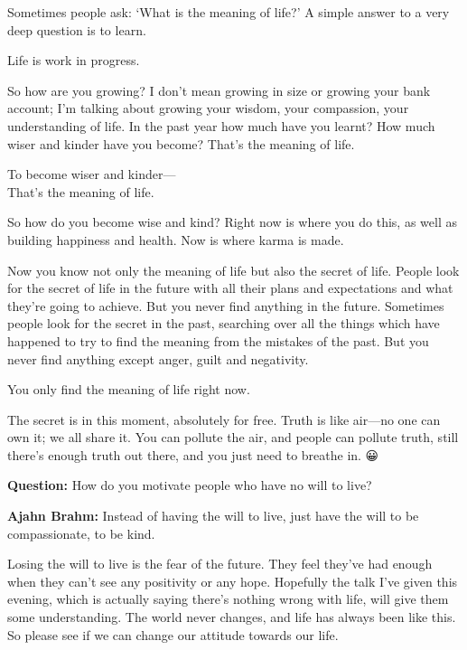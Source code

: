 \documentclass[12pt, openany]{book}
\newenvironment{aphorism}%
{%
\begin{center}\begin{itshape}
}%
{\end{itshape}\end{center}
}%
\begin{document}
Sometimes people ask: ‘What is the meaning of life?’ A simple answer to a very deep question is to learn. 

\begin{aphorism}
Life is work in progress.
\end{aphorism}

So how are you growing? I don’t mean growing in size or growing your bank account; I’m talking about growing your wisdom, your compassion, your understanding of life. In the past year how much have you learnt? How much wiser and kinder have you become? That’s the meaning of life. 

\begin{aphorism}
To become wiser and kinder—\\  
That’s the meaning of life.
\end{aphorism}

So how do you become wise and kind? Right now is where you do this, as well as building happiness and health. Now is where karma is made. 

Now you know not only the meaning of life but also the secret of life. People look for the secret of life in the future with all their plans and expectations and what they’re going to achieve. But you never find anything in the future. Sometimes people look for the secret in the past, searching over all the things which have happened to try to find the meaning from the mistakes of the past. But you never find anything except anger, guilt and negativity. 

\begin{aphorism}
You only find the meaning of life right now.
\end{aphorism}

The secret is in this moment, absolutely for free. Truth is like air—no one can own it; we all share it. You can pollute the air, and people can pollute truth, still there’s enough truth out there, and you just need to breathe in. 😀

\textbf{Question:} How do you motivate people who have no will to live? 

\textbf{Ajahn Brahm:} Instead of having the will to live, just have the will to be compassionate, to be kind. 

Losing the will to live is the fear of the future. They feel they’ve had enough when they can’t see any positivity or any hope. Hopefully the talk I’ve given this evening, which is actually saying there’s nothing wrong with life, will give them some understanding. The world never changes, and life has always been like this. So please see if we can change our attitude towards our life. 
\end{document}

